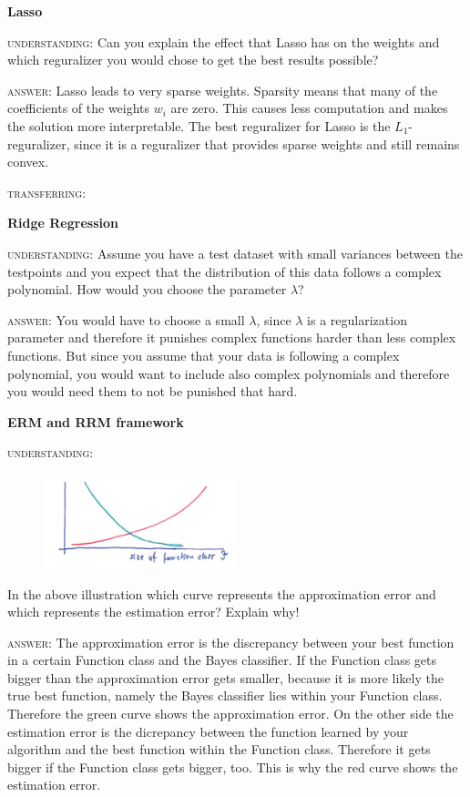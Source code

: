 \documentclass{article}
\begin{document}
\thispagestyle{empty}


\vspace{10mm}
\textbf{Lasso}

\textsc{understanding:} Can you explain the effect that Lasso has on the weights and which reguralizer you would chose to get the best results possible?

\textsc{answer:} Lasso leads to very sparse weights. Sparsity means that many of the coefficients of the weights $w_i$ are zero. This causes less computation and makes the solution more interpretable. The best reguralizer for Lasso is the $L_1$-reguralizer, since it is a reguralizer that provides sparse weights and still remains convex.

\textsc{transferring:}



\vspace{10mm}
\textbf{Ridge Regression}

\textsc{understanding:} Assume you have a test dataset with small variances between the testpoints and you expect that the distribution of this data follows a complex polynomial. How would you choose the parameter $\lambda$? 

\textsc{answer:} You would have to choose a small $\lambda$, since $\lambda$ is a regularization parameter and therefore it punishes complex functions harder than less complex functions. But since you assume that your data is following a complex polynomial, you would want to include also complex polynomials and therefore you would need them to not be punished that hard.



\vspace{10mm}
\textbf{ERM and RRM framework}

\textsc{understanding:} 
\begin{figure}[h!]
	\centering
	\includegraphics[width=0.5\textwidth]{erm.png}
\end{figure}

\noindent In the above illustration which curve represents the approximation error and which represents the estimation error? Explain why! 

\textsc{answer:} The approximation error is the discrepancy between your best function in a certain Function class and the Bayes classifier. If the Function class gets bigger than the approximation error gets smaller, because it is more likely the true best function, namely the Bayes classifier lies within your Function class. Therefore the green curve shows the approximation error. On the other side the estimation error is the dicrepancy between the function learned by your algorithm and the best function within the Function class. Therefore it gets bigger if the Function class gets bigger, too. This is why the red curve shows the estimation error. 
\end{document}
